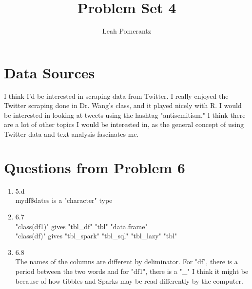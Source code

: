 \documentclass{article}
\title{Problem Set 4}
\author{Leah Pomerantz}
\begin{document}
\maketitle


\section{Data Sources}

I think I'd be interested in scraping data from Twitter. I really enjoyed the Twitter scraping done in Dr. Wang's class, and it played nicely with R. I would be interested in looking at tweets using the hashtag "antisemitism." I think there are a lot of other topics I would be interested in, as the general concept of using Twitter data and text analysis fascinates me.

\section{Questions from Problem 6}

\begin{enumerate}[label=(\alph*)]
  \item 5.d \\
  mydf\$dates is a "character" type
  \item 6.7 \\
  "class(df1)" gives "tbl\_df"     "tbl" "data.frame" \\
  "class(df)" gives "tbl\_spark" "tbl\_sql"   "tbl\_lazy"  "tbl"  
  \item 6.8 \\
  The names of the columns are different by deliminator. For "df", there is a period between the two words and for "df1", there is a "\_" I think it might be because of how tibbles and Sparks may be read differently by the computer.
\end{enumerate}
\end{document}
